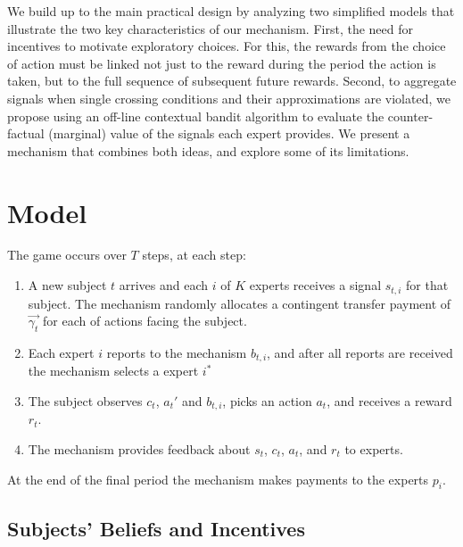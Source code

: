 


We build up to the main practical design by analyzing two simplified models that illustrate the two key characteristics of our mechanism. 
First, the need for incentives to motivate exploratory choices.
For this, the rewards from the choice of action must be linked not just to the reward during the period the action is taken, but to the full sequence of subsequent future rewards.
Second, to aggregate signals when single crossing conditions and their approximations are violated, we propose using an off-line contextual bandit algorithm to evaluate the counter-factual (marginal) value of the signals each expert provides.
We present a mechanism that combines both ideas, and explore some of its limitations.



\section{Model}

The game occurs over $T$ steps, at each step: 

\begin{enumerate}
\item A new subject $t$ arrives and each $i$ of $K$ experts receives a signal $s_{t,i}$ for that subject. The mechanism  randomly allocates a contingent transfer payment of $\vec{\gamma_t}$ for each of actions facing the subject.
\item Each expert $i$ reports to the mechanism ${b}_{t,i}$, and after all reports are received the mechanism selects a expert $i^{*}$ 
\item The subject observes $c_t$, $a_t'$ and ${b}_{t,i}$, picks an action $a_t$, and receives a reward $r_t$.
\item The mechanism provides feedback about $s_t$, $c_t$, $a_t$, and $r_t$ to experts.
\end{enumerate}

At the end of the final period the mechanism makes payments to the experts $p_i$.


\subsection{Subjects' Beliefs and Incentives}

